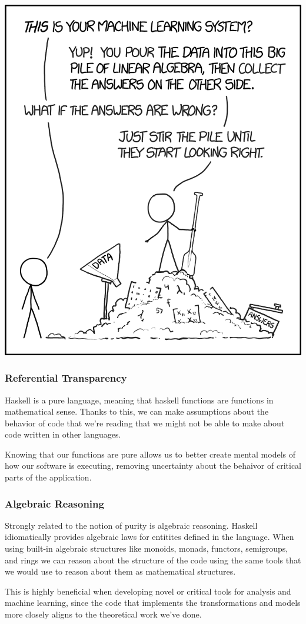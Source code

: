 \documentclass{beamer}
\begin{document}
\begin{frame}[fragile]
  \begin{center}
    \includegraphics[height=.85\paperheight]{images/ml.png}
  \end{center}
\end{frame}

\begin{frame}
  \frametitle{Referential Transparency}
  Haskell is a pure language, meaning that haskell functions are
  functions in mathematical sense.  Thanks to this, we can make
  assumptions about the behavior of code that we're reading that we
  might not be able to make about code written in other languages.

  Knowing that our functions are pure allows us to better create
  mental models of how our software is executing, removing uncertainty
  about the behaivor of critical parts of the application.
\end{frame}


\begin{frame}
  \frametitle{Algebraic Reasoning}
  Strongly related to the notion of purity is algebraic reasoning.
  Haskell idiomatically provides algebraic laws for entitites defined
  in the language.  When using built-in algebraic structures like
  monoids, monads, functors, semigroups, and rings we can reason about
  the structure of the code using the same tools that we would use to
  reason about them as mathematical structures.

  This is highly beneficial when developing novel or critical tools
  for analysis and machine learning, since the code that implements
  the transformations and models more closely aligns to the
  theoretical work we've done.
\end{frame}
\end{document}
